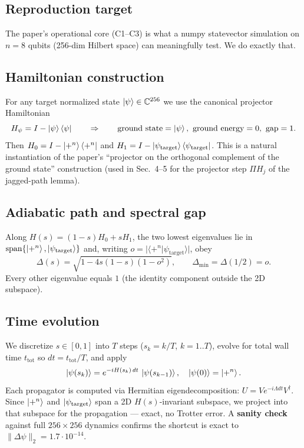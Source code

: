 \documentclass[11pt]{article}
\begin{document}
\subsection{Reproduction target}
The paper's operational core (C1--C3) is what a numpy statevector simulation on
$n=8$ qubits (256-dim Hilbert space) can meaningfully test. We do exactly that.

\subsection{Hamiltonian construction}
For any target normalized state $\ket{\psi}\in\mathbb{C}^{256}$ we use the
canonical projector Hamiltonian
\[
H_\psi = I - \ket{\psi}\bra{\psi}
\qquad\Rightarrow\qquad
\text{ground state}=\ket{\psi},\ \text{ground energy}=0,\ \text{gap}=1.
\]
Then $H_0 = I - \ket{+^n}\bra{+^n}$ and
$H_1 = I - \ket{\psi_\text{target}}\bra{\psi_\text{target}}$. This is a natural
instantiation of the paper's ``projector on the orthogonal complement of the
ground state'' construction (used in Sec.~4--5 for the projector step $\Pi H_j$
of the jagged-path lemma).

\subsection{Adiabatic path and spectral gap}
Along $H(s)=(1-s)H_0 + sH_1$, the two lowest eigenvalues lie in
$\mathrm{span}\{\ket{+^n},\ket{\psi_\text{target}}\}$ and, writing
$o=|\langle+^n|\psi_\text{target}\rangle|$, obey
\[
\Delta(s) = \sqrt{1 - 4 s(1-s)(1 - o^2)},
\qquad \Delta_\min = \Delta(1/2) = o.
\]
Every other eigenvalue equals $1$ (the identity component outside the 2D
subspace).

\subsection{Time evolution}
We discretize $s \in [0,1]$ into $T$ steps ($s_k = k/T$, $k=1..T$), evolve for
total wall time $t_\text{tot}$ so $dt = t_\text{tot}/T$, and apply
\[
\ket{\psi(s_k)} = e^{-i H(s_k)\, dt}\,\ket{\psi(s_{k-1})},
\quad \ket{\psi(0)} = \ket{+^n}.
\]
Each propagator is computed via Hermitian eigendecomposition:
$U = V e^{-i\Lambda dt} V^\dagger$. Since $\ket{+^n}$ and $\ket{\psi_\text{target}}$
span a 2D $H(s)$-invariant subspace, we project into that subspace for the
propagation --- exact, no Trotter error. A \textbf{sanity check} against
full $256\times256$ dynamics confirms the shortcut is exact to $\|\Delta\psi\|_2=1.7\cdot10^{-14}$.
\end{document}
